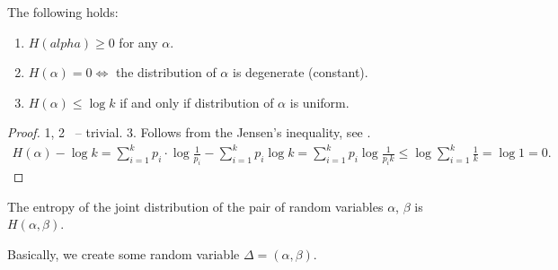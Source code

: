 \begin{lemma}
    The following holds:
    \begin{enumerate}
        \item $H(alpha) \geq 0$ for any $\alpha$.
        \item $H(\alpha) = 0 \iff $ the distribution of $\alpha$ is degenerate (constant).
        \item $H(\alpha) \leq \log k$ if and only if distribution of $\alpha$ is uniform.
    \end{enumerate}
\end{lemma}
\begin{proof}
    1, 2 ~-- trivial.
    3. Follows from the Jensen's inequality, see .
    \begin{align*}
        H(\alpha) - \log k = \sum_{i = 1}^k p_i \cdot \log \frac{1}{p_i} - \sum_{i = 1}^k p_i \log k = \sum_{i = 1}^k p_i \log \frac{1}{p_i k} \leq \log \sum_{i = 1}^k \frac{1}{k} = \log 1 = 0.
    \end{align*}
\end{proof}

\begin{definition}
    The entropy of the joint distribution of the pair of random variables $\alpha$, $\beta$ is  $H(\alpha, \beta)$.
\end{definition}
Basically, we create some random variable $\Delta = (\alpha, \beta)$.

